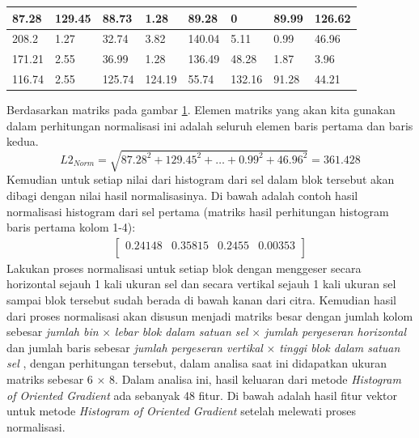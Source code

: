 \begin{enumerate}
\begin{table}[H]
\begin{small}
\begin{tabular}{|p{1cm}|p{1cm}|p{1cm}|p{1cm}|p{1cm}|p{1cm}|p{1cm}|p{1cm}|}
			\hline
			87.28 & 129.45 & 88.73 & 1.28 & 89.28 & 0 & 89.99 & 126.62 \\
			\hline
			208.2 & 1.27 & 32.74 & 3.82 & 140.04 & 5.11 & 0.99 & 46.96 \\
			\hline
			171.21 & 2.55 & 36.99 & 1.28 & 136.49 & 48.28 & 1.87 & 3.96 \\
			\hline
			116.74 & 2.55 & 125.74 & 124.19 & 55.74 & 132.16 & 91.28 & 44.21 \\
			\hline
		\end{tabular}
	\end{small}
	\label{fig:MatriksHasilPerhitunganHistogram}
\end{table}
Berdasarkan matriks pada gambar \ref{fig:MatriksHasilPerhitunganHistogram}. Elemen matriks yang akan kita gunakan dalam perhitungan normalisasi ini adalah seluruh elemen baris pertama dan baris kedua.
\begin{equation*}
L2_{Norm} = \sqrt{87.28^2 + 129.45^2 + \ldots + 0.99^2 + 46.96^2} = 361.428
\end{equation*}
Kemudian untuk setiap nilai dari histogram dari sel dalam blok tersebut akan dibagi dengan nilai hasil normalisasinya. Di bawah adalah contoh hasil normalisasi histogram dari sel pertama (matriks hasil perhitungan histogram baris pertama kolom 1-4):
\begin{gather*}
\begin{bmatrix}
0.24148 & 0.35815 & 0.2455 & 0.00353 \\
\end{bmatrix}
\end{gather*}
Lakukan proses normalisasi untuk setiap blok dengan menggeser secara horizontal sejauh 1 kali ukuran sel dan secara vertikal sejauh 1 kali ukuran sel sampai blok tersebut sudah berada di bawah kanan dari citra. Kemudian hasil dari proses normalisasi akan disusun menjadi matriks besar dengan jumlah kolom sebesar  \textit{jumlah bin} $\times$ \textit{lebar blok dalam satuan sel} $\times$ \textit{jumlah pergeseran horizontal} dan jumlah baris sebesar \textit{jumlah pergeseran vertikal} $\times$ \textit{tinggi blok dalam satuan sel} , dengan perhitungan tersebut, dalam analisa saat ini didapatkan ukuran matriks sebesar 6 $\times$ 8. Dalam analisa ini, hasil keluaran dari metode \textit{Histogram of Oriented Gradient} ada sebanyak 48 fitur. Di bawah adalah hasil fitur vektor untuk metode \textit{Histogram of Oriented Gradient} setelah melewati proses normalisasi.\\

\end{enumerate}
